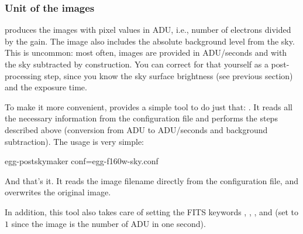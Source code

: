 \subsubsection{Unit of the \skymaker images}

\skymaker produces the images with pixel values in ADU, i.e., number of electrons divided by the gain. The image also includes the absolute background level from the sky. This is uncommon: most often, images are provided in ADU/seconds and with the sky subtracted by construction. You can correct for that yourself as a post-processing step, since you know the sky surface brightness (see previous section) and the exposure time.

To make it more convenient, \egg provides a simple tool to do just that: . It reads all the necessary information from the \skymaker configuration file and performs the steps described above (conversion from ADU to ADU/seconds and background subtraction). The usage is very simple:
\begin{bashcode}
egg-postskymaker conf=egg-f160w-sky.conf
\end{bashcode}
And that's it. It reads the image filename directly from the configuration file, and overwrites the original image.

In addition, this tool also takes care of setting the FITS keywords , , ,  and  (set to $1$ since the image is the number of ADU in one second).
